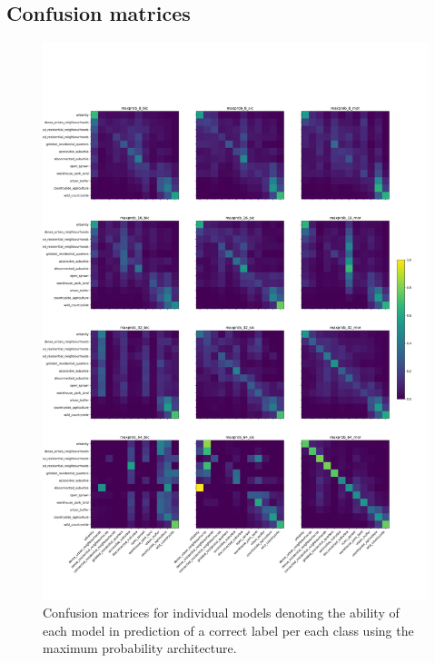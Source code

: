 \documentclass[]{interact}
\theoremstyle{plain}%
\theoremstyle{definition}
\theoremstyle{remark}
\begin{document}
\pagebreak

\subsection{Confusion matrices}
\label{sec:appendixC}

\begin{figure}
    \centering
    \includegraphics[width=.9\linewidth]{fig/maxprob_cm.png}
    \caption{Confusion matrices for individual models denoting
    the ability of each model in prediction of a correct label per each class
    using the maximum probability architecture.}
    \label{fig:maxprob_cm}
\end{figure}
\end{document}
